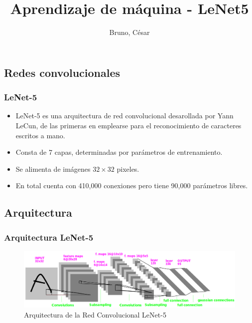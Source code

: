 \documentclass[xcolor=dvipsnames, compress]{beamer}
\title[LeNet]{Aprendizaje de máquina - LeNet5}
\author{Bruno, César}
\institute[ITAM]
\begin{document}
%
\begin{frame}
\titlepage
\end{frame}


\begin{frame}
\section{Redes convolucionales}
\frametitle{LeNet-5}

\begin{itemize}
	\item LeNet-5 es una arquitectura de red convolucional desarollada por Yann  LeCun, de las primeras en emplearse para el reconocimiento de caracteres escritos a mano.
	
	\item Consta de 7 capas, determinadas por parámetros de entrenamiento.
	
	\item Se alimenta de imágenes $32 \times 32$ pixeles.
	
	\item En total cuenta con 410,000 conexiones pero tiene 90,000 parámetros libres.
\end{itemize}





\end{frame}

\begin{frame}
\section{Arquitectura}
\frametitle{Arquitectura LeNet-5}

	\begin{figure}
		\includegraphics[scale=0.27]{images/lenet5_arch.png}
		\caption{Arquitectura de la Red Convolucional LeNet-5}
	 \end{figure}
\end{frame}
\end{document}
